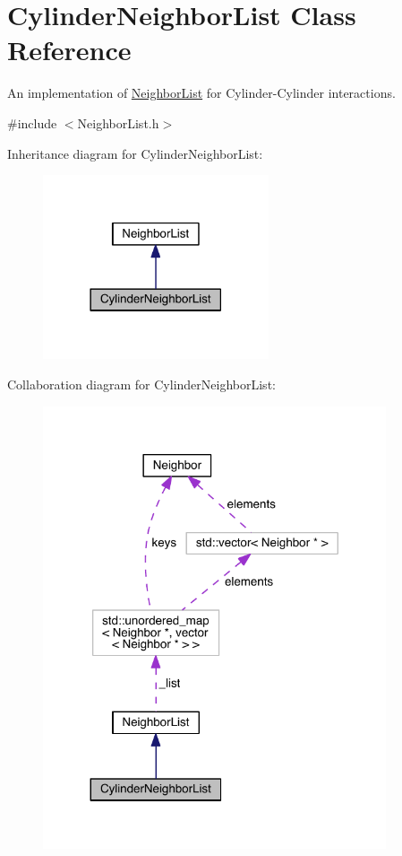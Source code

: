 \hypertarget{classCylinderNeighborList}{\section{Cylinder\+Neighbor\+List Class Reference}
\label{classCylinderNeighborList}
}


An implementation of \hyperlink{classNeighborList}{Neighbor\+List} for Cylinder-\/\+Cylinder interactions.  




{\ttfamily \#include $<$Neighbor\+List.\+h$>$}



Inheritance diagram for Cylinder\+Neighbor\+List\+:\nopagebreak
\begin{figure}[H]
\begin{center}
\leavevmode
\includegraphics[width=189pt]{classCylinderNeighborList__inherit__graph}
\end{center}
\end{figure}


Collaboration diagram for Cylinder\+Neighbor\+List\+:\nopagebreak
\begin{figure}[H]
\begin{center}
\leavevmode
\includegraphics[width=287pt]{classCylinderNeighborList__coll__graph}
\end{center}
\end{figure}
